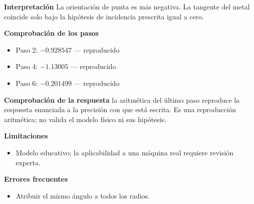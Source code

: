 \documentclass[10pt,openany]{book}
\begin{document}
\begin{tcolorbox}[title={Problema resuelto 1}, studiumworked, breakable]
\noindent\textbf{Interpretación}
La orientación de punta es más negativa. La tangente del metal coincide solo bajo la hipótesis de incidencia prescrita igual a cero.

\noindent\textbf{Comprobación de los pasos}
\begin{itemize}
\item Paso 2: $-0.928547$ — reproducido
\item Paso 4: $-1.13005$ — reproducido
\item Paso 6: $-0.201499$ — reproducido
\end{itemize}

\noindent\textbf{Comprobación de la respuesta} la aritmética del último paso reproduce la respuesta enunciada a la precisión con que está escrita. Es una reproducción aritmética; no valida el modelo físico ni sus hipótesis.

\noindent\textbf{Limitaciones}
\begin{itemize}
\item Modelo educativo; la aplicabilidad a una máquina real requiere revisión experta.
\end{itemize}

\noindent\textbf{Errores frecuentes}
\begin{itemize}
\item Atribuir el mismo ángulo a todos los radios.
\end{itemize}
\end{tcolorbox}
\end{document}
